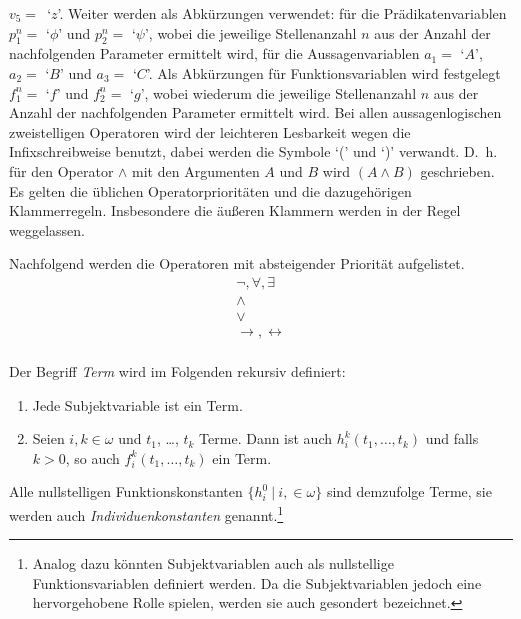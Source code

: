 \documentclass[a4paper,german,10pt,twoside]{book}
\theoremstyle{definition}
\theoremstyle{remark}
\begin{document}
\mbox{$v_5 = $ `$z$'}. 
Weiter werden als Abk{\"u}rzungen verwendet: f{\"u}r die Pr{\"a}dikatenvariablen 
$p^n_1 = $ `$\phi$' und $p^n_2 = $ `$\psi$', wobei die jeweilige 
Stellenanzahl $n$ aus der Anzahl der nachfolgenden Parameter ermittelt 
wird, f{\"u}r die Aussagenvariablen $a_1 = $ `$A$', $a_2 = $ `$B$' und 
$a_3 = $ `$C$'. Als Abk{\"u}rzungen f{\"u}r Funktionsvariablen wird festgelegt 
$f^n_1 = $ `$f$' und $f^n_2 = $ `$g$', wobei wiederum die jeweilige 
Stellenanzahl $n$ aus der Anzahl der nachfolgenden Parameter ermittelt 
wird. Bei allen aussagenlogischen zwei\-stelligen Operatoren wird der 
leichteren Lesbarkeit wegen die Infixschreibweise benutzt, dabei werden 
die Symbole `(' und `)' verwandt. 
D.~h. f{\"u}r den Operator $\land$ mit den Argumenten $A$ und $B$ wird 
$(A \land B)$ geschrieben. 
Es gelten die {\"u}blichen Operatorpriorit{\"a}ten und die dazugeh{\"o}rigen 
Klammerregeln. Insbesondere die {\"a}u{\ss}eren Klammern werden in der Regel 
weggelassen.

\par
Nachfolgend werden die Operatoren mit absteigender Priorit{\"a}t aufgelistet.
$$
\begin{array}{c}
  \neg, \forall, \exists  \\
  \land \\
  \lor \\
  \rightarrow, \leftrightarrow \\
\end{array}
$$

\par
Der Begriff \emph{Term} wird im Folgenden rekursiv 
definiert:

\begin{enumerate}
\item Jede Subjektvariable ist ein Term. \item Seien $i, k \in \omega$ 
und $t_1$, \ldots, $t_k$ Terme. Dann ist auch $h^k_i(t_1, \ldots, t_k)$
und falls $k > 0$, so auch $f^k_i(t_1, \ldots, t_k)$ ein Term.
\end{enumerate}

Alle nullstelligen Funktionskonstanten $\{h^0_i~|~i, \in \omega\}$ sind 
demzufolge Terme, sie werden auch \emph{Individuenkonstanten} 
genannt.\footnote{Analog dazu k{\"o}nnten Subjektvariablen auch als 
nullstellige Funktionsvariablen definiert werden. Da die 
Subjektvariablen jedoch eine hervorgehobene Rolle spielen, werden sie 
auch gesondert bezeichnet.}
\end{document}
